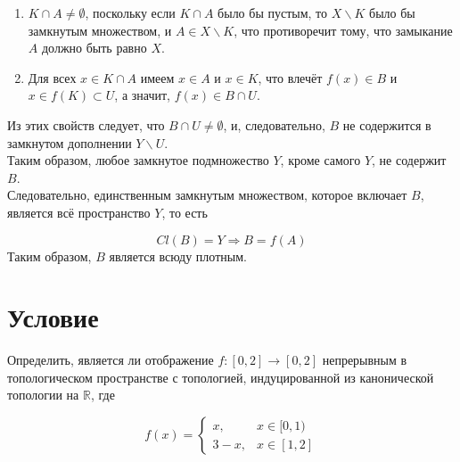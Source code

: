 \documentclass{article}
\begin{document}
        \begin{enumerate}
            \item $K \cap A \neq \emptyset$, поскольку если $K \cap A$ было бы пустым, то $X \backslash K$ было бы замкнутым множеством, и $A \in X \backslash K$, что противоречит тому, что замыкание $A$ должно быть равно $X$.
            \item Для всех $x \in K \cap A$ имеем $x \in A$ и $x \in K$, что влечёт $f(x) \in B$ и $x \in f(K) \subset U$, а значит, $f(x) \in B \cap U$.
        \end{enumerate}
        Из этих свойств следует, что $B \cap U \neq \emptyset$, и, следовательно, $B$ не содержится в замкнутом дополнении $Y \backslash U$.  \\
        Таким образом, любое замкнутое подмножество $Y$, кроме самого $Y$, не содержит $B$.  \\
        Следовательно, единственным замкнутым множеством, которое включает $B$, является всё пространство $Y$, то есть
        
        \[
        Cl(B) = Y \Rightarrow B = f(A)
        \]
        Таким образом, $B$ является всюду плотным.

        \section{Условие}
        Определить, является ли отображение $f : [0, 2] \rightarrow [0, 2]$ непрерывным в топологическом пространстве с топологией, индуцированной из канонической топологии на $\mathbb{R}$, где
        
        \[
        f(x) = 
        \begin{cases} 
        x, & x \in [0, 1) \\
        3 - x, & x \in [1, 2]
        \end{cases}
        \]
        
\end{document}
